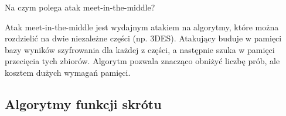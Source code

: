 \documentclass[answers,11pt]{exam}
\begin{document}
\begin{questions}
\question Na czym polega atak meet-in-the-middle?
\begin{solution}
Atak meet-in-the-middle jest wydajnym atakiem na algorytmy, które można rozdzielić na dwie niezależne części (np. 3DES). Atakujący buduje w pamięci bazy wyników szyfrowania dla każdej z części, a następnie szuka w pamięci przecięcia tych zbiorów. Algorytm pozwala znacząco obniżyć liczbę prób, ale kosztem dużych wymagań pamięci.
\end{solution}


\end{questions}



\subsection{Algorytmy funkcji skrótu}
\end{document}
